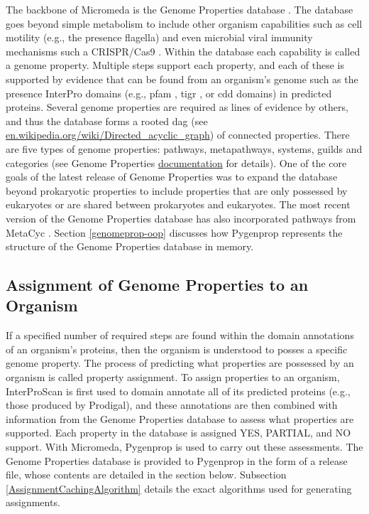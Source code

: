The backbone of Micromeda is the Genome Properties database \cite{Haft2013}. The database goes beyond simple metabolism to include other organism capabilities such as cell motility (e.g., the presence flagella) and even microbial viral immunity mechanisms such a CRISPR/Cas9 \cite{horvath2010crispr}. Within the database each capability is called a genome property. Multiple steps support each property, and each of these is supported by evidence that can be found from an organism's genome such as the presence InterPro domains (e.g., \gls{pfam} \cite{bateman2004pfam}, \gls{tigr} \cite{haft2001tigrfams}, or \gls{cdd} \cite{marchler2014cdd} domains) in predicted proteins. Several genome properties are required as lines of evidence by others, and thus the database forms a rooted \gls{dag} (see \href{http://en.wikipedia.org/wiki/Directed_acyclic_graph}{en.wikipedia.org/wiki/Directed\_acyclic\_graph}) of connected properties. There are five types of genome properties: pathways, metapathways, systems, guilds and categories (see Genome Properties \href{https://genome-properties.readthedocs.io/en/latest/flatfile.html#genome-property-types}{documentation} for details). One of the core goals of the latest release of Genome Properties was to expand the database beyond prokaryotic properties to include properties that are only possessed by eukaryotes or are shared between prokaryotes and eukaryotes. The most recent version of the Genome Properties database has also incorporated pathways from MetaCyc \cite{karp2002metacyc}. Section \ref{genomeprop-oop} discusses how Pygenprop represents the structure of the Genome Properties database in memory.

\subsection{Assignment of Genome Properties to an Organism}

If a specified number of required steps are found within the domain annotations of an organism's proteins, then the organism is understood to posses a specific genome property. The process of predicting what properties are possessed by an organism is called property assignment. To assign properties to an organism, InterProScan is first used to domain annotate all of its predicted proteins (e.g., those produced by Prodigal), and these annotations are then combined with information from the Genome Properties database to assess what properties are supported. Each property in the database is assigned YES, PARTIAL, and NO support. With Micromeda, Pygenprop is used to carry out these assessments. The Genome Properties database is provided to Pygenprop in the form of a release file, whose contents are detailed in the section below. Subsection \ref{AssignmentCachingAlgorithm} details the exact algorithms used for generating assignments.  

